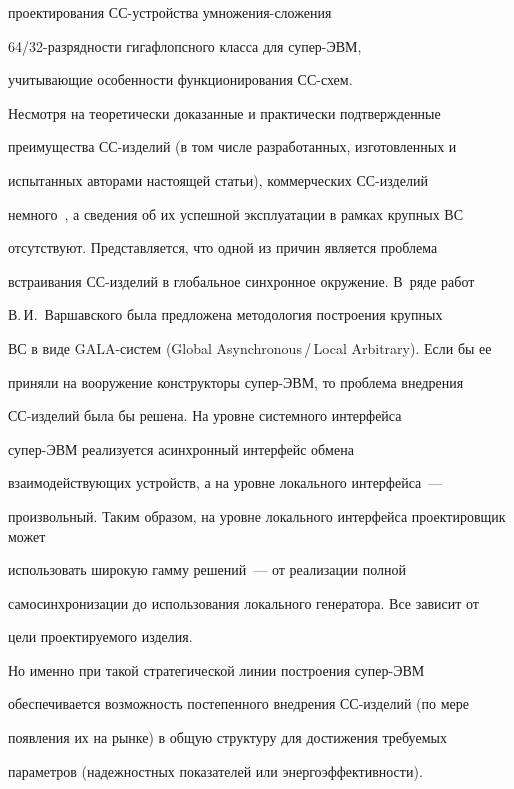 проектирования СС-устрой\-ст\-ва умно\-же\-ния-сло\-же\-ния

      64/32-раз\-ряд\-ности гигафлопсного класса для су\-пер-ЭВМ,

учитывающие особенности функционирования СС-схем.



      Несмотря на теоретически доказанные и практически подтвержденные

преимущества СС-из\-де\-лий (в том числе разработанных, изготовленных и

испытанных авторами настоящей статьи), коммерческих СС-из\-де\-лий

немного~\cite{4-st1}, а сведения об их успешной эксплуатации в рамках крупных ВС

отсутствуют. Представляется, что одной из причин является проблема

встраивания СС-из\-де\-лий в глобальное синхронное окружение. В~ряде работ

В.\,И.~Вар\-шав\-ско\-го была предложена методология построения крупных

ВС в виде GALA-систем (Global Asynchronous\,/\,Local Arbitrary). Если бы ее

приняли на вооружение конструкторы су\-пер-ЭВМ, то проблема внедрения

СС-из\-де\-лий была бы решена. На уровне системного интерфейса

      су\-пер-ЭВМ реализуется асинхронный интерфейс обмена

взаимодействующих устройств, а на уровне локального интерфейса~---

произвольный. Таким образом, на уровне локального интерфейса проектировщик может

использовать широкую гамму решений~--- от реализации полной

самосинхронизации до использования локального генератора. Все зависит от

цели проектируемого изделия.



      Но именно при такой стратегической линии построения су\-пер-ЭВМ

обеспечивается возможность постепенного внедрения СС-из\-де\-лий (по мере

появления их на рынке) в общую структуру для достижения требуемых

параметров (надежностных показателей или энергоэффективности).




